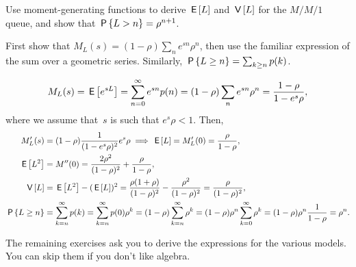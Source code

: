 \documentclass[queueing-book.tex]{subfiles}
\begin{document}
\begin{exercise}\label{ex:34}
Use moment-generating functions to derive $\E\L$ and $\V\L$ for the $M/M/1$ queue, and show that $\P{L>n} = \rho^{n+1}$.
\begin{hint}
First show that $M_L(s) = (1-\rho) \sum_n e^{s n} \rho^n$, then use the familiar expression of the sum over a geometric series.
Similarly, $\P{\L\geq n} = \sum_{k\geq n} p(k)$.
\end{hint}
\begin{solution}
\begin{equation*}
 M_L(s) = \E{e^{s L}} = \sum_{n=0}^\infty e^{s n}p(n) = (1-\rho) \sum_n e^{s n} \rho^n=\frac{1-\rho}{1-e^{s}\rho},
\end{equation*}
where we assume that~$s$ is such that $e^s \rho < 1$. Then,
\begin{align*}
 M_L'(s) &= (1-\rho) \frac{1}{(1-e^s\rho)^2} e^s \rho \implies \E\L = M_L'(0)= \frac{\rho}{1-\rho}, \\
 \E{\L^2}&= M''(0)= \frac{2\rho^2}{(1-\rho)^2} + \frac{\rho}{1-\rho},\\
\V\L &= \E{L^2} - (\E\L)^2 = \frac{\rho(1+\rho)}{(1-\rho)^2}-\frac{\rho^2}{(1-\rho)^2} = \frac{\rho}{(1-\rho)^2},\\
 \P{\L\geq n}
 &= \sum_{k=n}^\infty p(k) = \sum_{k=n}^\infty p(0)\rho^k = (1-\rho)\sum_{k=n}^\infty \rho^k
= (1-\rho)\rho^n \sum_{k=0}^\infty\rho^k = (1-\rho) \rho^n \frac1{1-\rho} = \rho^n.
\end{align*}
\end{solution}
\end{exercise}


The remaining exercises ask you to derive the  expressions for the various models. You can skip them if you don't like algebra.
\end{document}
